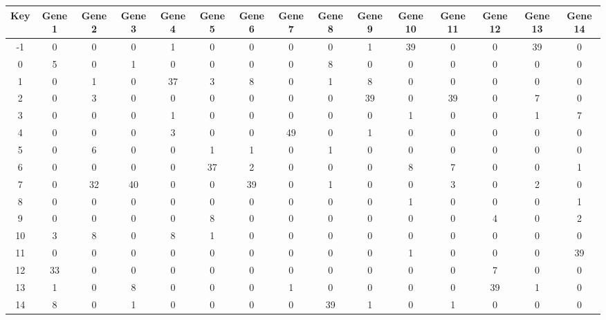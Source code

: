 \begin{tabular}{|c|c|c|c|c|c|c|c|c|c|c|c|c|c|c|}
\hline
Key & Gene 1 & Gene 2 & Gene 3 & Gene 4 & Gene 5 & Gene 6 & Gene 7 & Gene 8 & Gene 9 & Gene 10 & Gene 11 & Gene 12 & Gene 13 & Gene 14 \\
\hline
-1 & 0 & 0 & 0 & 1 & 0 & 0 & 0 & 0 & 1 & 39 & 0 & 0 & 39 & 0 \\
0 & 5 & 0 & 1 & 0 & 0 & 0 & 0 & 8 & 0 & 0 & 0 & 0 & 0 & 0 \\
1 & 0 & 1 & 0 & 37 & 3 & 8 & 0 & 1 & 8 & 0 & 0 & 0 & 0 & 0 \\
2 & 0 & 3 & 0 & 0 & 0 & 0 & 0 & 0 & 39 & 0 & 39 & 0 & 7 & 0 \\
3 & 0 & 0 & 0 & 1 & 0 & 0 & 0 & 0 & 0 & 1 & 0 & 0 & 1 & 7 \\
4 & 0 & 0 & 0 & 3 & 0 & 0 & 49 & 0 & 1 & 0 & 0 & 0 & 0 & 0 \\
5 & 0 & 6 & 0 & 0 & 1 & 1 & 0 & 1 & 0 & 0 & 0 & 0 & 0 & 0 \\
6 & 0 & 0 & 0 & 0 & 37 & 2 & 0 & 0 & 0 & 8 & 7 & 0 & 0 & 1 \\
7 & 0 & 32 & 40 & 0 & 0 & 39 & 0 & 1 & 0 & 0 & 3 & 0 & 2 & 0 \\
8 & 0 & 0 & 0 & 0 & 0 & 0 & 0 & 0 & 0 & 1 & 0 & 0 & 0 & 1 \\
9 & 0 & 0 & 0 & 0 & 8 & 0 & 0 & 0 & 0 & 0 & 0 & 4 & 0 & 2 \\
10 & 3 & 8 & 0 & 8 & 1 & 0 & 0 & 0 & 0 & 0 & 0 & 0 & 0 & 0 \\
11 & 0 & 0 & 0 & 0 & 0 & 0 & 0 & 0 & 0 & 1 & 0 & 0 & 0 & 39 \\
12 & 33 & 0 & 0 & 0 & 0 & 0 & 0 & 0 & 0 & 0 & 0 & 7 & 0 & 0 \\
13 & 1 & 0 & 8 & 0 & 0 & 0 & 1 & 0 & 0 & 0 & 0 & 39 & 1 & 0 \\
14 & 8 & 0 & 1 & 0 & 0 & 0 & 0 & 39 & 1 & 0 & 1 & 0 & 0 & 0 \\
\hline
\end{tabular}